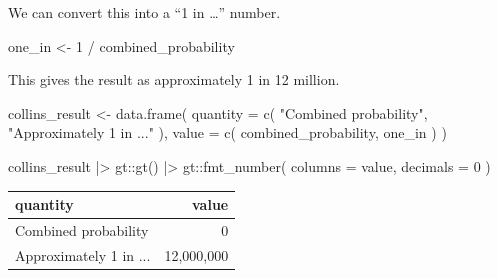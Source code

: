 \documentclass[
  letterpaper,
  DIV=11,
  numbers=noendperiod]{scrreprt}
\newenvironment{Shaded}{\begin{snugshade}}{\end{snugshade}}
\newcommand{\AttributeTok}[1]{\textcolor[rgb]{0.40,0.45,0.13}{#1}}
\newcommand{\DecValTok}[1]{\textcolor[rgb]{0.68,0.00,0.00}{#1}}
\newcommand{\FunctionTok}[1]{\textcolor[rgb]{0.28,0.35,0.67}{#1}}
\newcommand{\NormalTok}[1]{\textcolor[rgb]{0.00,0.23,0.31}{#1}}
\newcommand{\OtherTok}[1]{\textcolor[rgb]{0.00,0.23,0.31}{#1}}
\newcommand{\SpecialCharTok}[1]{\textcolor[rgb]{0.37,0.37,0.37}{#1}}
\newcommand{\StringTok}[1]{\textcolor[rgb]{0.13,0.47,0.30}{#1}}
\begin{document}
\begin{Shaded}
\end{Shaded}

We can convert this into a ``1 in \ldots'' number.

\begin{Shaded}
\begin{Highlighting}[]
\NormalTok{one\_in }\OtherTok{\textless{}{-}} \DecValTok{1} \SpecialCharTok{/}\NormalTok{ combined\_probability}
\end{Highlighting}
\end{Shaded}

This gives the result as approximately 1 in 12 million.

\begin{Shaded}
\begin{Highlighting}[]
\NormalTok{collins\_result }\OtherTok{\textless{}{-}} \FunctionTok{data.frame}\NormalTok{(}
  \AttributeTok{quantity =} \FunctionTok{c}\NormalTok{(}
    \StringTok{"Combined probability"}\NormalTok{,}
    \StringTok{"Approximately 1 in ..."}
\NormalTok{  ),}
  \AttributeTok{value =} \FunctionTok{c}\NormalTok{(}
\NormalTok{    combined\_probability,}
\NormalTok{    one\_in}
\NormalTok{  )}
\NormalTok{)}

\NormalTok{collins\_result }\SpecialCharTok{|\textgreater{}}
\NormalTok{  gt}\SpecialCharTok{::}\FunctionTok{gt}\NormalTok{() }\SpecialCharTok{|\textgreater{}}
\NormalTok{  gt}\SpecialCharTok{::}\FunctionTok{fmt\_number}\NormalTok{(}
    \AttributeTok{columns =}\NormalTok{ value,}
    \AttributeTok{decimals =} \DecValTok{0}
\NormalTok{  )}
\end{Highlighting}
\end{Shaded}

\begin{table}
\fontsize{12.0pt}{14.0pt}\selectfont
\begin{tabular*}{\linewidth}{@{\extracolsep{\fill}}lr}
\toprule
quantity & value \\ 
\midrule\addlinespace[2.5pt]
Combined probability & 0 \\ 
Approximately 1 in ... & 12,000,000 \\ 
\bottomrule
\end{tabular*}
\end{table}
\end{document}
